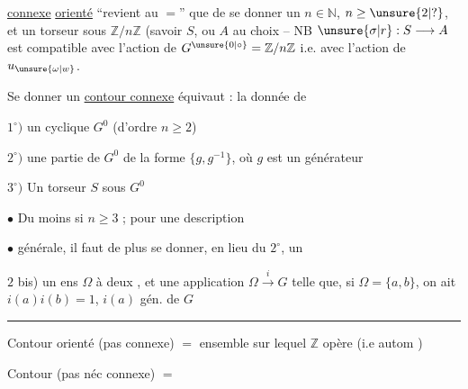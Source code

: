 \uline{connexe} \uline{orienté} ``revient au $=$'' que de se donner un $n\in\mathbb{N}$, $n\geq\unsure{2|?}$, et un  torseur sous $\mathbb{Z}/n\mathbb{Z}$ (savoir $S$, ou $A$ au choix -- NB $\unsure{\sigma|r}:S\longrightarrow A$ est compatible avec l'action de $G^{\unsure{0|\circ}}=\mathbb{Z}/n\mathbb{Z}$ i.e. avec l'action de $u_{\unsure{\omega|w}}$.

Se donner un \uline{contour connexe} équivaut : la donnée de

$1^{\circ})$ un  cyclique $G^{0}$ (d'ordre $n\geq2$)

$2^{\circ})$ une  partie de $G^{0}$  de la forme $\{g,g^{-1}\}$, où $g$ est un générateur 

$3^{\circ})$ Un torseur $S$ sous $G^{0}$

$\bullet$ Du moins si $n\geq3$  ; pour une description

$\bullet$ générale, il faut de plus se donner, en lieu du $2^{\circ}$, un

$2$ bis) un ens $\Omega$ à deux , et une application $\Omega\xrightarrow{i}G$ telle que, si $\Omega=\{a,b\}$, on ait $i(a)i(b)=1$, $i(a)$ gén. de $G$

\begin{center}\rule{1cm}{.35pt}\end{center}

Contour orienté (pas  connexe) $=$ ensemble sur lequel $\mathbb{Z}$ opère (i.e  autom )

Contour (pas néc connexe) $=$ 
